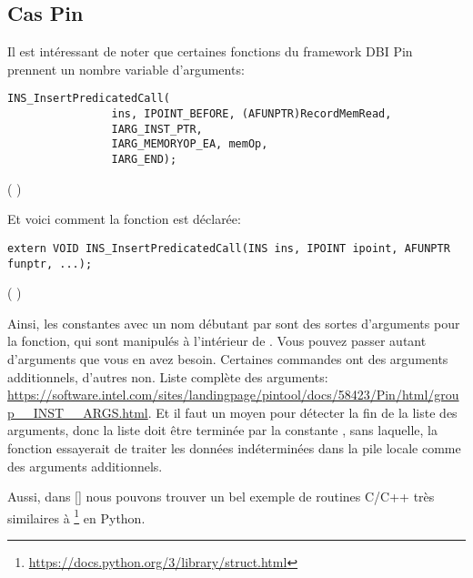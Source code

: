 \subsection{Cas Pin}

Il est intéressant de noter que certaines fonctions du framework \ac{DBI} Pin prennent
un nombre variable d'arguments:

\begin{lstlisting}[style=customc]
            INS_InsertPredicatedCall(
                ins, IPOINT_BEFORE, (AFUNPTR)RecordMemRead,
                IARG_INST_PTR,
                IARG_MEMORYOP_EA, memOp,
                IARG_END);
\end{lstlisting}
(  )

Et voici comment la fonction  est déclarée:

\begin{lstlisting}[style=customc]
extern VOID INS_InsertPredicatedCall(INS ins, IPOINT ipoint, AFUNPTR funptr, ...);
\end{lstlisting}
(  )

Ainsi, les constantes avec un nom débutant par  sont des sortes d'arguments
pour la fonction, qui sont manipulés à l'intérieur de .
Vous pouvez passer autant d'arguments que vous en avez besoin.
Certaines commandes ont des arguments additionnels, d'autres non.
Liste complète des arguments:
\url{https://software.intel.com/sites/landingpage/pintool/docs/58423/Pin/html/group__INST__ARGS.html}.
Et il faut un moyen pour détecter la fin de la liste des arguments, donc la liste
doit être terminée par la constante , sans laquelle, la fonction essayerait
de traiter les données indéterminées dans la pile locale comme des arguments additionnels.

Aussi, dans [\RobPikePractice] nous pouvons trouver un bel exemple de routines C/C++
très similaires à \footnote{\url{https://docs.python.org/3/library/struct.html}}
en Python.


